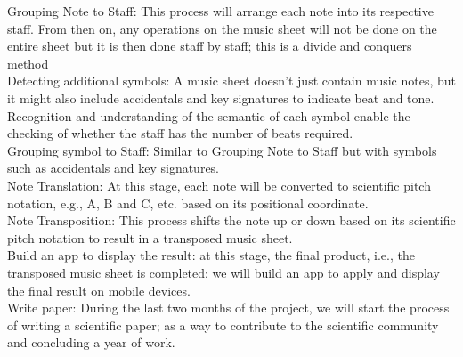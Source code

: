\documentclass[a4paper,12pt]{report}
\begin{document}
Grouping Note to Staff: This process will arrange each note into its respective
staff. From then on, any operations on the music sheet will not be done on the entire sheet
but it is then done staff by staff; this is a divide and conquers method\\

Detecting additional symbols: A music sheet doesn't just contain music notes, but
it might also include accidentals and key signatures to indicate beat and tone.
Recognition and understanding of the semantic of each symbol enable the checking
of whether the staff has the number of beats required.\\

Grouping symbol to Staff: Similar to Grouping Note to Staff but with symbols such as
accidentals and key signatures.\\

Note Translation: At this stage, each note will be converted to
scientific pitch notation, e.g., A, B and C, etc. based on its positional
coordinate.\\

Note Transposition: This process shifts the note up or down based on its
scientific pitch notation to result in a transposed music sheet.\\

Build an app to display the result: at this stage, the final product, i.e., the
transposed music sheet is completed; we will build an app to apply and display
the final result on mobile devices.\\

Write paper: During the last two months of the project, we will start the
process of writing a scientific paper; as a way to contribute to the scientific
community and concluding a year of work.\\


\printbibliography
\end{document}
